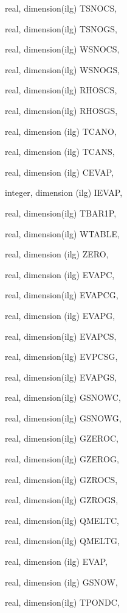 {\begin{DoxyParamCaption}
\item[{real, dimension(ilg)}]{T\+S\+N\+O\+C\+S, }
\item[{real, dimension(ilg)}]{T\+S\+N\+O\+G\+S, }
\item[{real, dimension(ilg)}]{W\+S\+N\+O\+C\+S, }
\item[{real, dimension(ilg)}]{W\+S\+N\+O\+G\+S, }
\item[{real, dimension(ilg)}]{R\+H\+O\+S\+C\+S, }
\item[{real, dimension(ilg)}]{R\+H\+O\+S\+G\+S, }
\item[{real, dimension (ilg)}]{T\+C\+A\+N\+O, }
\item[{real, dimension (ilg)}]{T\+C\+A\+N\+S, }
\item[{real, dimension (ilg)}]{C\+E\+V\+A\+P, }
\item[{integer, dimension (ilg)}]{I\+E\+V\+A\+P, }
\item[{real, dimension(ilg)}]{T\+B\+A\+R1\+P, }
\item[{real, dimension(ilg)}]{W\+T\+A\+B\+L\+E, }
\item[{real, dimension  (ilg)}]{Z\+E\+R\+O, }
\item[{real, dimension (ilg)}]{E\+V\+A\+P\+C, }
\item[{real, dimension(ilg)}]{E\+V\+A\+P\+C\+G, }
\item[{real, dimension (ilg)}]{E\+V\+A\+P\+G, }
\item[{real, dimension(ilg)}]{E\+V\+A\+P\+C\+S, }
\item[{real, dimension(ilg)}]{E\+V\+P\+C\+S\+G, }
\item[{real, dimension(ilg)}]{E\+V\+A\+P\+G\+S, }
\item[{real, dimension(ilg)}]{G\+S\+N\+O\+W\+C, }
\item[{real, dimension(ilg)}]{G\+S\+N\+O\+W\+G, }
\item[{real, dimension(ilg)}]{G\+Z\+E\+R\+O\+C, }
\item[{real, dimension(ilg)}]{G\+Z\+E\+R\+O\+G, }
\item[{real, dimension(ilg)}]{G\+Z\+R\+O\+C\+S, }
\item[{real, dimension(ilg)}]{G\+Z\+R\+O\+G\+S, }
\item[{real, dimension(ilg)}]{Q\+M\+E\+L\+T\+C, }
\item[{real, dimension(ilg)}]{Q\+M\+E\+L\+T\+G, }
\item[{real, dimension  (ilg)}]{E\+V\+A\+P, }
\item[{real, dimension (ilg)}]{G\+S\+N\+O\+W, }
\item[{real, dimension(ilg)}]{T\+P\+O\+N\+D\+C, }

\end{DoxyParamCaption}}
